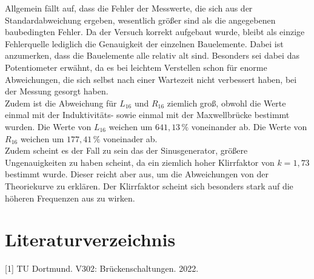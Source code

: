 \documentclass[
  bibliography=totoc,     %
  captions=tableheading,  %
  titlepage=firstiscover, %
]{scrartcl}
\begin{document}
  Allgemein fällt auf, dass die Fehler der Messwerte, die sich aus der Standardabweichung ergeben, wesentlich größer sind
  als die angegebenen baubedingten Fehler. Da der Versuch korrekt aufgebaut wurde, bleibt als einzige Fehlerquelle lediglich 
  die Genauigkeit der einzelnen Bauelemente. Dabei ist anzumerken, dass die Bauelemente alle relativ alt sind. 
  Besonders sei dabei das Potentiometer erwähnt, da es bei leichtem Verstellen schon für enorme Abweichungen, die sich selbst
  nach einer Wartezeit nicht verbessert haben, bei der Messung gesorgt haben. \\
  Zudem ist die Abweichung für $L_{16}$ und $R_{16}$ ziemlich groß, obwohl die Werte einmal mit der Induktivitäts- sowie einmal
  mit der Maxwellbrücke bestimmt wurden. Die Werte von $L_{16}$ weichen um $641,13\,\%$ voneinander ab. Die Werte von $R_{16}$
  weichen um $177,41\,\%$ voneinader ab.\\
  Zudem scheint es der Fall zu sein das der Sinusgenerator, größere Ungenauigkeiten zu haben scheint, da ein ziemlich hoher
  Klirrfaktor von $k=1,73$ bestimmt wurde. Dieser reicht aber aus, um die Abweichungen von der Theoriekurve zu erklären.
  Der Klirrfaktor scheint sich besonders stark auf die höheren Frequenzen aus zu wirken.


  \newpage
  \section{Literaturverzeichnis}
    [1] TU Dortmund. V302: Brückenschaltungen. 2022.
\end{document}
